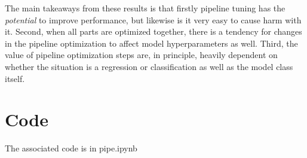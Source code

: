 \documentclass[12pt, letterpaper]{article}
\begin{document}
The main takeaways from these results is that firstly pipeline tuning has the \emph{potential} to improve performance, but likewise is it very easy to cause harm with it. Second, when all parts are optimized together, there is a tendency for changes in the pipeline optimization to affect model hyperparameters as well. Third, the value of pipeline optimization steps are, in principle, heavily dependent on whether the situation is a regression or classification as well as the model class itself.

\section{Code} %

The associated code is in pipe.ipynb
\end{document}
